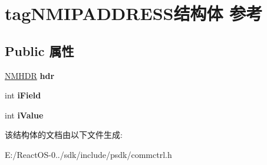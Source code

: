 \hypertarget{structtag_n_m_i_p_a_d_d_r_e_s_s}{}\section{tag\+N\+M\+I\+P\+A\+D\+D\+R\+E\+S\+S结构体 参考}
\label{structtag_n_m_i_p_a_d_d_r_e_s_s}
\subsection*{Public 属性}
\begin{DoxyCompactItemize}
\item 
\mbox{\label{structtag_n_m_i_p_a_d_d_r_e_s_s_a024db3daa3c5808b4cf07228ab056bd2}} 
\hyperlink{structtag_n_m_h_d_r}{N\+M\+H\+DR} {\bfseries hdr}
\item 
\mbox{\label{structtag_n_m_i_p_a_d_d_r_e_s_s_a1a2aa03e682b8d3e8787c185aeade73d}} 
int {\bfseries i\+Field}
\item 
\mbox{\label{structtag_n_m_i_p_a_d_d_r_e_s_s_a3e027d7631f2470bd534d58eb168c4a4}} 
int {\bfseries i\+Value}
\end{DoxyCompactItemize}


该结构体的文档由以下文件生成\+:\begin{DoxyCompactItemize}
\item 
E\+:/\+React\+O\+S-\/0../sdk/include/psdk/commctrl.\+h\end{DoxyCompactItemize}
